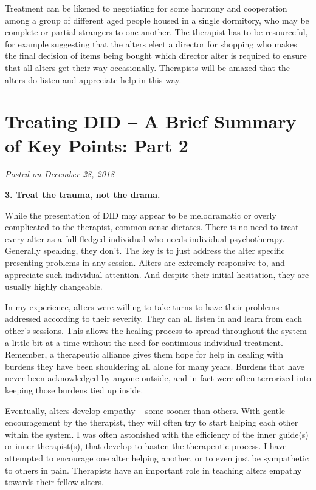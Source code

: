 \documentclass[]{book}
\begin{document}
Treatment can be likened to negotiating for some harmony and cooperation among a group of different aged people housed in a single dormitory, who may be complete or partial strangers to one another. The therapist has to be resourceful, for example suggesting that the alters elect a director for shopping who makes the final decision of items being bought which director alter is required to ensure that all alters get their way occasionally. Therapists will be amazed that the alters do listen and appreciate help in this way.

\hypertarget{treating-did-a-brief-summary-of-key-points-part-2}{%
\section{Treating DID -- A Brief Summary of Key Points: Part 2}\label{treating-did-a-brief-summary-of-key-points-part-2}}

\emph{Posted on December 28, 2018}

\textbf{3. Treat the trauma, not the drama.}

While the presentation of DID may appear to be melodramatic or overly complicated to the therapist, common sense dictates. There is no need to treat every alter as a full fledged individual who needs individual psychotherapy. Generally speaking, they don't. The key is to just address the alter specific presenting problems in any session. Alters are extremely responsive to, and appreciate such individual attention. And despite their initial hesitation, they are usually highly changeable.

In my experience, alters were willing to take turns to have their problems addressed according to their severity. They can all listen in and learn from each other's sessions. This allows the healing process to spread throughout the system a little bit at a time without the need for continuous individual treatment. Remember, a therapeutic alliance gives them hope for help in dealing with burdens they have been shouldering all alone for many years. Burdens that have never been acknowledged by anyone outside, and in fact were often terrorized into keeping those burdens tied up inside.

Eventually, alters develop empathy -- some sooner than others. With gentle encouragement by the therapist, they will often try to start helping each other within the system. I was often astonished with the efficiency of the inner guide(s) or inner therapist(s), that develop to hasten the therapeutic process. I have attempted to encourage one alter helping another, or to even just be sympathetic to others in pain. Therapists have an important role in teaching alters empathy towards their fellow alters.
\end{document}
